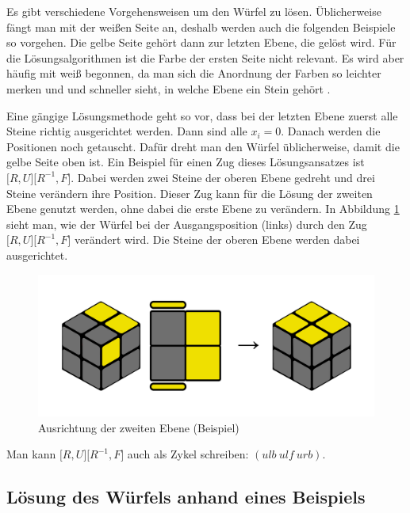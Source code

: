 \documentclass[12pt,a4paper, usenames, dvipsnames]{article}
\begin{document}
Es gibt verschiedene Vorgehensweisen um den Würfel zu lösen. Üblicherweise fängt man mit der weißen Seite an, deshalb werden auch die folgenden Beispiele so vorgehen. Die gelbe Seite gehört dann zur letzten Ebene, die gelöst wird. 
Für die Lösungsalgorithmen ist die Farbe der ersten Seite nicht relevant. Es wird aber häufig mit weiß begonnen, da man sich die Anordnung der Farben so leichter merken und und schneller sieht, in welche Ebene ein Stein gehört \cite{RF}. 

Eine gängige Lösungsmethode geht so vor, dass bei der letzten Ebene zuerst alle Steine richtig ausgerichtet werden. Dann sind alle $x_i=0$. Danach werden die Positionen noch getauscht. 
Dafür dreht man den Würfel üblicherweise, damit die gelbe Seite oben ist. 
Ein Beispiel für einen Zug dieses Lösungsansatzes ist $\lbrack R, U \rbrack \lbrack R^{-1}, F \rbrack$. Dabei werden zwei Steine der oberen Ebene gedreht und drei Steine verändern ihre Position. Dieser Zug kann für die Lösung der zweiten Ebene genutzt werden, ohne dabei die erste Ebene zu verändern. \cite{RF2} 
In Abbildung \ref{25} sieht man, wie der Würfel bei der Ausgangsposition (links) durch den Zug $\lbrack R, U \rbrack \lbrack R^{-1}, F \rbrack$ verändert wird. Die Steine der oberen Ebene werden dabei ausgerichtet.

\begin{figure}[h]
\centering
\includegraphics[scale=0.12]{isiakanm.png}
\caption{Ausrichtung der zweiten Ebene (Beispiel)}
\label{25}
\end{figure}

Man kann $\lbrack R, U \rbrack \lbrack R^{-1}, F \rbrack$ auch als Zykel schreiben: $(ulb \ ulf \ urb)$. 
%
%
%
%
%
%
%
%
%
%
%
%
%
%
%
%
%
%
%
%
\subsection*{Lösung des Würfels anhand eines Beispiels}
\end{document}
